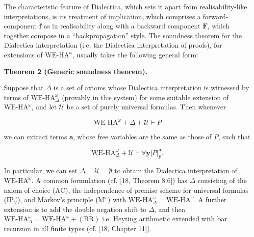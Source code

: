 \documentclass[10pt,a4paper]{article}
\begin{document}
 
 
 
The characteristic feature of Dialectica, which sets it apart from realisability-like interpretations, is its treatment of implication, which comprises a forward-component $\bm{f}$ as in realisability along with a backward component $\bm{F}$, which together compose in a “backpropagation” style. The soundness theorem for the Dialectica interpretation (i.e. the Dialectica interpretation of proofs), for extensions of $\mathrm{WE}\mbox{-}\mathrm{HA}^{\omega}$, usually takes the following general form:\par
 
 
 
\par\medskip\noindent\textbf{Theorem 2 (Generic soundness theorem).}\par
 
 
Suppose that $\Delta$ is a set of axioms whose Dialectica interpretation is witnessed by terms of $\mathrm{WE}\mbox{-}\mathrm{HA}^{\omega}_{\Delta}$ (provably in this system) for some suitable extension of $\mathrm{WE}\mbox{-}\mathrm{HA}^{\omega}$, and let $\mathcal{U}$ be a set of purely universal formulas. Then whenever\par
  
\par  \quad  \[\mathrm{WE}\mbox{-}\mathrm{HA}^{\omega}+\Delta+\mathcal{U}\vdash P\]\quad  \quad  
  
we can extract terms $\bm{a}$, whose free variables are the same as those of $P$, such that\par
  
\par  \quad  \[\mathrm{WE}\mbox{-}\mathrm{HA}^{\omega}_{\Delta}+\mathcal{U}\vdash\forall\bm{y}|{P}|^{\bm{a}}_{\bm{y}}.\]\quad  \quad  
  
 
 
 
In particular, we can set $\Delta=\mathcal{U}=\emptyset$ to obtain the Dialectica interpretation of $\mathrm{WE}\mbox{-}\mathrm{HA}^{\omega}$. A common formulation (cf. [18, Theorem 8.6]) has $\Delta$ consisting of the axiom of choice ($\mathrm{AC}$), the independence of premise scheme for universal formulas ($\mathrm{IP}^{\omega}_{\forall}$), and Markov’s principle ($\mathrm{M}^{\omega}$) with $\mathrm{WE}\mbox{-}\mathrm{HA}^{\omega}_{\Delta}=\mathrm{WE}\mbox{-}\mathrm{HA}^{\omega}$. A further extension is to add the double negation shift to $\Delta$, and then $\mathrm{WE}\mbox{-}\mathrm{HA}^{\omega}_{\Delta}=\mathrm{WE}\mbox{-}\mathrm{HA}^{\omega}+(\mathrm{BR})$ i.e. Heyting arithmetic extended with bar recursion in all finite types (cf. [18, Chapter 11]).\par
 
\end{document}
